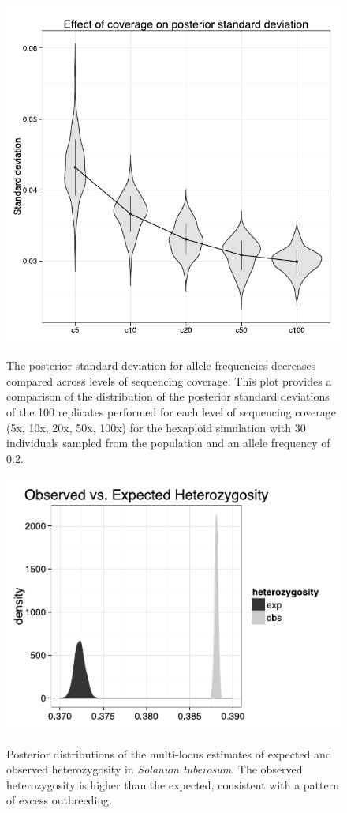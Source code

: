 \documentclass[11pt,english,letterpaper,oneside]{article}
\begin{document}
\begin{figure}
\centering
\caption{The posterior standard deviation for allele frequencies decreases compared across levels of sequencing coverage. This plot provides a comparison of the distribution of the posterior standard deviations of the 100 replicates performed for each level of sequencing coverage (5x, 10x, 20x, 50x, 100x) for the hexaploid simulation with 30 individuals sampled from the population and an allele frequency of 0.2.}
\vspace{0.25in}
\includegraphics{pdf/fig2}
\label{fig2:coverage-sd}
\end{figure}


\begin{figure}
\centering
\caption{Posterior distributions of the multi-locus estimates of expected and observed heterozygosity in \textit{Solanum tuberosum}. The observed heterozygosity is higher than the expected, consistent with a pattern of excess outbreeding.}
\vspace{0.25in}
\includegraphics{pdf/fig3}
\label{fig3:het}
\end{figure}
\end{document}
